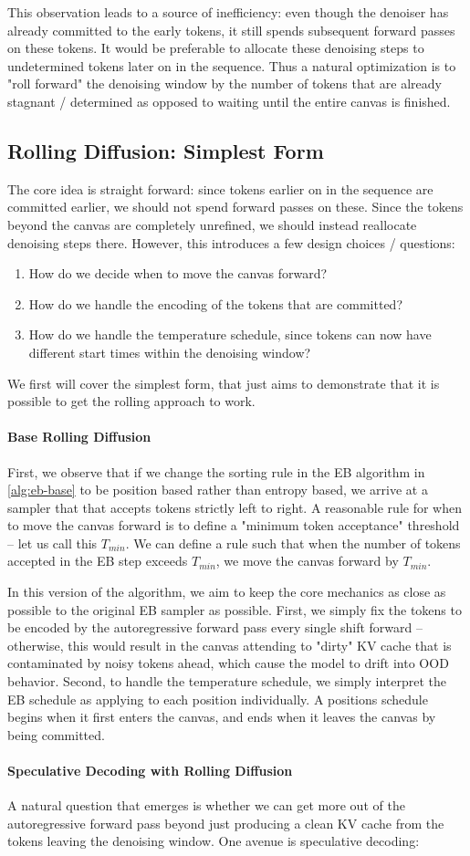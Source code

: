 This observation leads to a source of inefficiency: even though the denoiser has already committed to the early tokens, it still spends subsequent forward passes on these tokens. It would be preferable to allocate these denoising steps to undetermined tokens later on in the sequence. Thus a natural optimization is to "roll forward" the denoising window by the number of tokens that are already stagnant / determined as opposed to waiting until the entire canvas is finished. 

\subsection{Rolling Diffusion: Simplest Form}
The core idea is straight forward: since tokens earlier on in the sequence are committed earlier, we should not spend forward passes on these. Since the tokens beyond the canvas are completely unrefined, we should instead reallocate denoising steps there. However, this introduces a few design choices / questions: 
\begin{enumerate}
    \item How do we decide when to move the canvas forward? 
    \item How do we handle the encoding of the tokens that are committed?
    \item How do we handle the temperature schedule, since tokens can now have different start times within the denoising window?
\end{enumerate}

We first will cover the simplest form, that just aims to demonstrate that it is possible to get the rolling approach to work.

\paragraph{Base Rolling Diffusion}
First, we observe that if we change the sorting rule in the EB algorithm in \ref{alg:eb-base} to be position based rather than entropy based, we arrive at a sampler that that accepts tokens strictly left to right. A reasonable rule for when to move the canvas forward is to define a "minimum token acceptance" threshold -- let us call this $T_{min}$. We can define a rule such that when the number of tokens accepted in the EB step exceeds $T_{min}$, we move the canvas forward by $T_{min}$. 

In this version of the algorithm, we aim to keep the core mechanics as close as possible to the original EB sampler as possible. First, we simply fix the tokens to be encoded by the autoregressive forward pass every single shift forward -- otherwise, this would result in the canvas attending to "dirty" KV cache that is contaminated by noisy tokens ahead, which cause the model to drift into OOD behavior. Second, to handle the temperature schedule, we simply interpret the EB schedule as applying to each position individually. A positions schedule begins when it first enters the canvas, and ends when it leaves the canvas by being committed.

\paragraph{Speculative Decoding with Rolling Diffusion}
A natural question that emerges is whether we can get more out of the autoregressive forward pass beyond just producing a clean KV cache from the tokens leaving the denoising window. One avenue is speculative decoding: 


